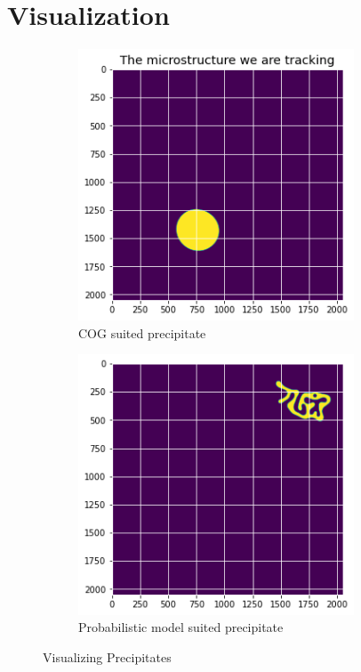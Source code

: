 \documentclass[12pt, a4paper]{report}
\begin{document}
\section{Visualization}
\begin{figure}[H]
\centering
\begin{subfigure}{.45\textwidth}
  \centering
  \includegraphics[width=0.9\textwidth]{Pictures/Tracking/Traching_cog.jpeg}
  \caption{COG suited precipitate}
  \label{img:microstrImg}
\end{subfigure}
\begin{subfigure}{.45\textwidth}
  \centering
  \includegraphics[width=0.9\textwidth]{Pictures/Tracking/Tracking_choosing_ppt.jpeg}
  \caption{Probabilistic model suited precipitate}
  \label{img:MicrostrImg}
\end{subfigure}
\caption{Visualizing Precipitates}
\label{fig:test}
\end{figure}
\end{document}
